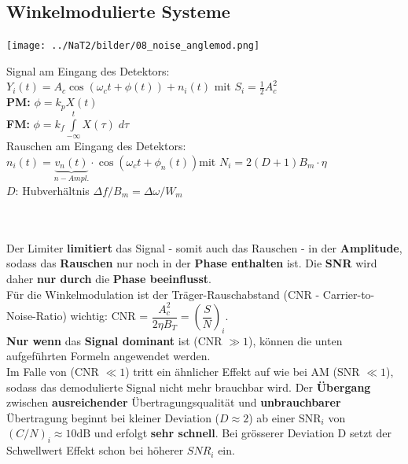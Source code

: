 \subsection{Winkelmodulierte Systeme }
\begin{minipage}{10cm}
	\texttt{[image: ../NaT2/bilder/08\_noise\_anglemod.png]}
\end{minipage}
\begin{minipage}{9cm}
	Signal am Eingang des Detektors:\\
	\hspace*{0.3cm} $Y_i(t) = A_c \cos(\omega_c t + \phi(t)) + n_i(t)$ \qquad mit \quad $S_i = \frac{1}{2} A_c^2$ \\
	\hspace*{0.6cm} \textbf{PM:} \quad $\phi = k_p X(t)$\\
	\hspace*{0.6cm} \textbf{FM:} \quad $\phi = k_f \int\limits_{-\infty}^{t} X(\tau) \; d\tau$ \\
	Rauschen am Eingang des Detektors:\\ 
	\hspace*{0.3cm} $n_i(t) = \underbrace{v_n(t)}_{n-Ampl.} \cdot \cos(\omega_c t + \phi_n(t))$\quad mit \quad $N_i = 2 (D+1)B_m\cdot\eta$\\
	\hspace*{0.6cm} $D$: \quad Hubverhältnis $\Delta f / B_m = \Delta \omega / W_m$
\end{minipage}\\ \\
Der Limiter \textbf{limitiert} das Signal - somit auch das Rauschen - in der \textbf{Amplitude}, 
sodass das \textbf{Rauschen} nur noch in der \textbf{Phase enthalten} ist. 
Die \textbf{SNR} wird daher \textbf{nur durch }die \textbf{Phase beeinflusst}. \\ 

Für die Winkelmodulation ist der Träger-Rauschabstand (CNR - Carrier-to-Noise-Ratio) wichtig: 
CNR = $ \dfrac{A_c^2}{2 \eta B_T} = \left(\dfrac{S}{N}\right)_i$. \\
\textbf{Nur wenn} das \textbf{Signal dominant} ist (CNR $\gg 1$), können die unten aufgeführten
Formeln angewendet werden. \\ 
Im Falle von (CNR $\ll 1$) tritt ein ähnlicher Effekt auf wie bei AM (SNR $\ll 1$), 
sodass das demodulierte Signal nicht mehr brauchbar wird. Der \textbf{Übergang} zwischen \textbf{ausreichender} Übertragungsqualität und \textbf{unbrauchbarer}  
Übertragung beginnt bei kleiner Deviation ($D \approx 2$) ab einer \unboldmath$ \text{SNR}_{i}$ von $(C/N)_i \approx 10 \text{dB} $ und erfolgt \textbf{sehr schnell}. Bei grösserer Deviation D setzt der Schwellwert Effekt schon bei höherer $SNR_i$ ein.

